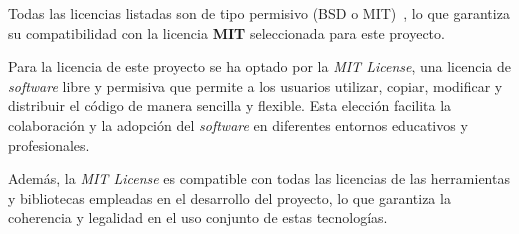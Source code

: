 
Todas las licencias listadas son de tipo permisivo (BSD o MIT)~\cite{wiki:licenciaBSD,wiki:licenciaMIT}, lo que garantiza su compatibilidad con la licencia \textbf{MIT} seleccionada para este proyecto.

Para la licencia de este proyecto se ha optado por la \textit{MIT License}, una licencia de \textit{software} libre y permisiva que permite a los usuarios utilizar, copiar, modificar y distribuir el código de manera sencilla y flexible. Esta elección facilita la colaboración y la adopción del \textit{software} en diferentes entornos educativos y profesionales.

Además, la \textit{MIT License} es compatible con todas las licencias de las herramientas y bibliotecas empleadas en el desarrollo del proyecto, lo que garantiza la coherencia y legalidad en el uso conjunto de estas tecnologías.
